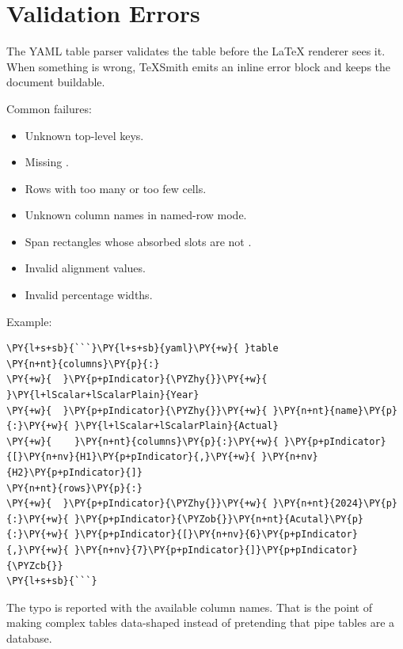\documentclass[a4paper,twoside]{article}
\begin{document}
\section{Validation Errors}
The YAML table parser validates the table before the \LaTeX{} renderer sees it.
When something is wrong, TeXSmith emits an inline error block and keeps the
document buildable.

Common failures:
\begin{itemize}
\item Unknown top-level keys.
\item Missing .
\item Rows with too many or too few cells.
\item Unknown column names in named-row mode.
\item Span rectangles whose absorbed slots are not \tscodeinline{\textasciitilde{}}.
\item Invalid alignment values.
\item Invalid percentage widths.
\end{itemize}
Example:
\begin{tscode}[lang=markdown, engine=pygments]
\begin{Verbatim}[commandchars=\\\{\},breaklines, breakanywhere, commandchars=\\\{\}]
\PY{l+s+sb}{```}\PY{l+s+sb}{yaml}\PY{+w}{ }table
\PY{n+nt}{columns}\PY{p}{:}
\PY{+w}{  }\PY{p+pIndicator}{\PYZhy{}}\PY{+w}{ }\PY{l+lScalar+lScalarPlain}{Year}
\PY{+w}{  }\PY{p+pIndicator}{\PYZhy{}}\PY{+w}{ }\PY{n+nt}{name}\PY{p}{:}\PY{+w}{ }\PY{l+lScalar+lScalarPlain}{Actual}
\PY{+w}{    }\PY{n+nt}{columns}\PY{p}{:}\PY{+w}{ }\PY{p+pIndicator}{[}\PY{n+nv}{H1}\PY{p+pIndicator}{,}\PY{+w}{ }\PY{n+nv}{H2}\PY{p+pIndicator}{]}
\PY{n+nt}{rows}\PY{p}{:}
\PY{+w}{  }\PY{p+pIndicator}{\PYZhy{}}\PY{+w}{ }\PY{n+nt}{2024}\PY{p}{:}\PY{+w}{ }\PY{p+pIndicator}{\PYZob{}}\PY{n+nt}{Acutal}\PY{p}{:}\PY{+w}{ }\PY{p+pIndicator}{[}\PY{n+nv}{6}\PY{p+pIndicator}{,}\PY{+w}{ }\PY{n+nv}{7}\PY{p+pIndicator}{]}\PY{p+pIndicator}{\PYZcb{}}
\PY{l+s+sb}{```}
\end{Verbatim}
\end{tscode}
The typo  is reported with the available column names. That is the
point of making complex tables data-shaped instead of pretending that pipe
tables are a database.
\end{document}
